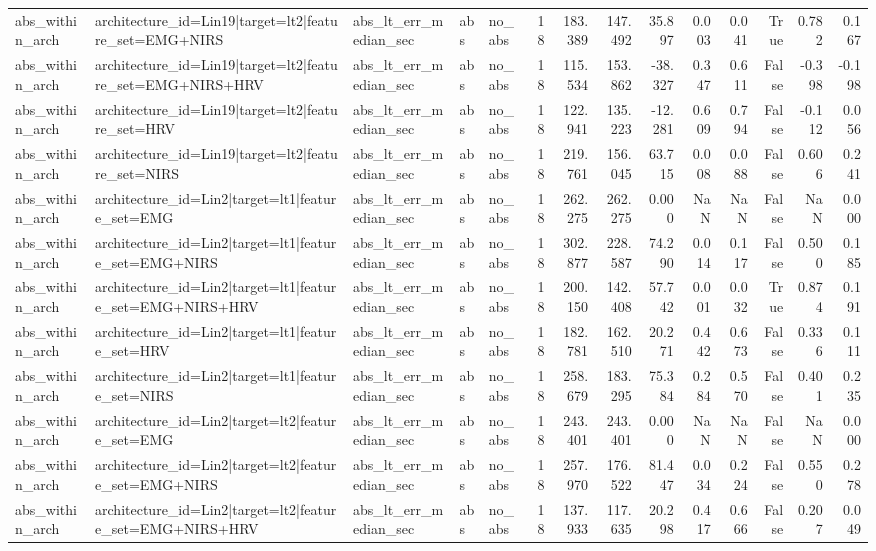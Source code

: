 \begin{table}
\begin{tabular}{lllllrrrrrrrrr}
abs_within_arch & architecture_id=Lin19|target=lt2|feature_set=EMG+NIRS & abs_lt_err_median_sec & abs & no_abs & 18 & 183.389 & 147.492 & 35.897 & 0.003 & 0.041 & True & 0.782 & 0.167 \\
abs_within_arch & architecture_id=Lin19|target=lt2|feature_set=EMG+NIRS+HRV & abs_lt_err_median_sec & abs & no_abs & 18 & 115.534 & 153.862 & -38.327 & 0.347 & 0.611 & False & -0.398 & -0.198 \\
abs_within_arch & architecture_id=Lin19|target=lt2|feature_set=HRV & abs_lt_err_median_sec & abs & no_abs & 18 & 122.941 & 135.223 & -12.281 & 0.609 & 0.794 & False & -0.112 & 0.056 \\
abs_within_arch & architecture_id=Lin19|target=lt2|feature_set=NIRS & abs_lt_err_median_sec & abs & no_abs & 18 & 219.761 & 156.045 & 63.715 & 0.008 & 0.088 & False & 0.606 & 0.241 \\
abs_within_arch & architecture_id=Lin2|target=lt1|feature_set=EMG & abs_lt_err_median_sec & abs & no_abs & 18 & 262.275 & 262.275 & 0.000 & NaN & NaN & False & NaN & 0.000 \\
abs_within_arch & architecture_id=Lin2|target=lt1|feature_set=EMG+NIRS & abs_lt_err_median_sec & abs & no_abs & 18 & 302.877 & 228.587 & 74.290 & 0.014 & 0.117 & False & 0.500 & 0.185 \\
abs_within_arch & architecture_id=Lin2|target=lt1|feature_set=EMG+NIRS+HRV & abs_lt_err_median_sec & abs & no_abs & 18 & 200.150 & 142.408 & 57.742 & 0.001 & 0.032 & True & 0.874 & 0.191 \\
abs_within_arch & architecture_id=Lin2|target=lt1|feature_set=HRV & abs_lt_err_median_sec & abs & no_abs & 18 & 182.781 & 162.510 & 20.271 & 0.442 & 0.673 & False & 0.336 & 0.111 \\
abs_within_arch & architecture_id=Lin2|target=lt1|feature_set=NIRS & abs_lt_err_median_sec & abs & no_abs & 18 & 258.679 & 183.295 & 75.384 & 0.284 & 0.570 & False & 0.401 & 0.235 \\
abs_within_arch & architecture_id=Lin2|target=lt2|feature_set=EMG & abs_lt_err_median_sec & abs & no_abs & 18 & 243.401 & 243.401 & 0.000 & NaN & NaN & False & NaN & 0.000 \\
abs_within_arch & architecture_id=Lin2|target=lt2|feature_set=EMG+NIRS & abs_lt_err_median_sec & abs & no_abs & 18 & 257.970 & 176.522 & 81.447 & 0.034 & 0.224 & False & 0.550 & 0.278 \\
abs_within_arch & architecture_id=Lin2|target=lt2|feature_set=EMG+NIRS+HRV & abs_lt_err_median_sec & abs & no_abs & 18 & 137.933 & 117.635 & 20.298 & 0.417 & 0.666 & False & 0.207 & 0.049 \\

\end{tabular}
\end{table}
